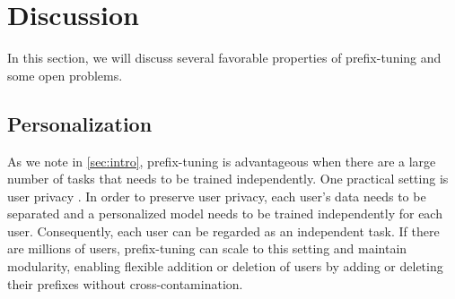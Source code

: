 \documentclass[11pt,a4paper]{article}
\newcommand\pl[1]{\textcolor{red}{[PL: #1]}}
\newcommand\lisa[1]{\textcolor{blue}{[Lisa: #1]}}
\begin{document}
\section{Discussion}
\label{sec:discussion}
In this section, we will discuss several favorable properties of prefix-tuning and some open problems. 

\subsection{Personalization} 

As we note in \cref{sec:intro}, prefix-tuning is advantageous when there are a large number of tasks that needs to be trained independently. 
One practical setting is user privacy \cite{Shokri-Shmatikov-2015, McMahan-et-al-2016}. In order to preserve user privacy, each user's data needs to be separated and a personalized model needs to be trained independently for each user. Consequently, each user can be regarded as an independent task. 
If there are millions of users, prefix-tuning can scale to this setting and maintain modularity, enabling flexible addition or deletion of users by adding or deleting their prefixes without cross-contamination. 
\end{document}

